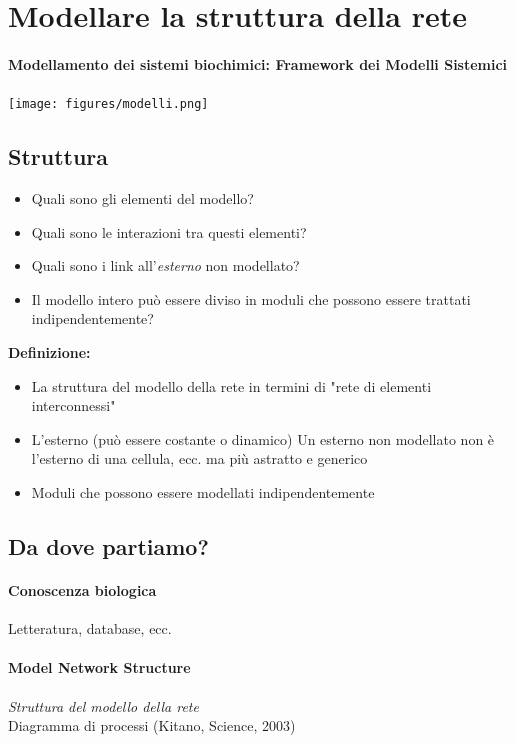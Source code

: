 \documentclass{article}
\begin{document}
\section{Modellare la struttura della rete}
\paragraph{Modellamento dei sistemi biochimici: Framework dei Modelli Sistemici}
\begin{center}
    \texttt{[image: figures/modelli.png]}
\end{center}
\subsection{Struttura}
\begin{itemize}
    \item Quali sono gli elementi del modello?
    \item Quali sono le interazioni tra questi elementi?
    \item Quali sono i link all'\textit{esterno} non modellato?
    \item Il modello intero può essere diviso in moduli che possono essere trattati indipendentemente?
\end{itemize}
\textbf{Definizione:}
\begin{itemize}
    \item La struttura del modello della rete in termini di "rete di elementi interconnessi"
    \item L'esterno (può essere costante o dinamico)
    \subitem Un esterno non modellato non è l'esterno di una cellula, ecc. ma più astratto e generico
    \item Moduli che possono essere modellati indipendentemente
\end{itemize}
\subsection{Da dove partiamo?}
\paragraph{Conoscenza biologica}
Letteratura, database, ecc.
\paragraph{Model Network Structure} \textit{Struttura del modello della rete}\\
Diagramma di processi (Kitano, Science, 2003)
\end{document}

